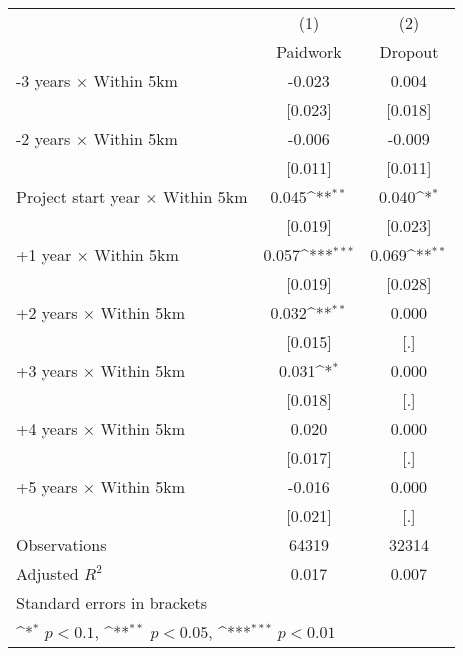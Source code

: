 {
\def\sym#1{\ifmmode^{#1}\else\(^{#1}\)\fi}
\begin{tabular}{l*{2}{c}}
\hline\hline
                    &\multicolumn{1}{c}{(1)}&\multicolumn{1}{c}{(2)}\\
                    &\multicolumn{1}{c}{Paidwork}&\multicolumn{1}{c}{Dropout}\\
\hline
-3 years × Within 5km&      -0.023         &       0.004         \\
                    &     [0.023]         &     [0.018]         \\
-2 years × Within 5km&      -0.006         &      -0.009         \\
                    &     [0.011]         &     [0.011]         \\
Project start year × Within 5km&       0.045\sym{**} &       0.040\sym{*}  \\
                    &     [0.019]         &     [0.023]         \\
+1 year × Within 5km&       0.057\sym{***}&       0.069\sym{**} \\
                    &     [0.019]         &     [0.028]         \\
+2 years × Within 5km&       0.032\sym{**} &       0.000         \\
                    &     [0.015]         &         [.]         \\
+3 years × Within 5km&       0.031\sym{*}  &       0.000         \\
                    &     [0.018]         &         [.]         \\
+4 years × Within 5km&       0.020         &       0.000         \\
                    &     [0.017]         &         [.]         \\
+5 years × Within 5km&      -0.016         &       0.000         \\
                    &     [0.021]         &         [.]         \\
\hline
Observations        &       64319         &       32314         \\
Adjusted \(R^{2}\)  &       0.017         &       0.007         \\
\hline\hline
\multicolumn{3}{l}{\footnotesize Standard errors in brackets}\\
\multicolumn{3}{l}{\footnotesize \sym{*} \(p<0.1\), \sym{**} \(p<0.05\), \sym{***} \(p<0.01\)}\\
\end{tabular}
}
